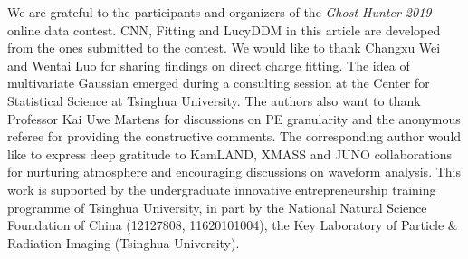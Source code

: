 \acknowledgments
We are grateful to the participants and organizers of the \textit{Ghost Hunter 2019} online data contest.  CNN, Fitting and LucyDDM in this article are developed from the ones submitted to the contest.  We would like to thank Changxu Wei and Wentai Luo for sharing findings on direct charge fitting.  The idea of multivariate Gaussian emerged during a consulting session at the Center for Statistical Science at Tsinghua University.  The authors also want to thank Professor Kai Uwe Martens for discussions on PE granularity and the anonymous referee for providing the constructive comments.  The corresponding author would like to express deep gratitude to KamLAND, XMASS and JUNO collaborations for nurturing atmosphere and encouraging discussions on waveform analysis.  This work is supported by the undergraduate innovative entrepreneurship training programme of Tsinghua University, in part by the National Natural Science Foundation of China (12127808, 11620101004), the Key Laboratory of Particle \& Radiation Imaging (Tsinghua University). 

